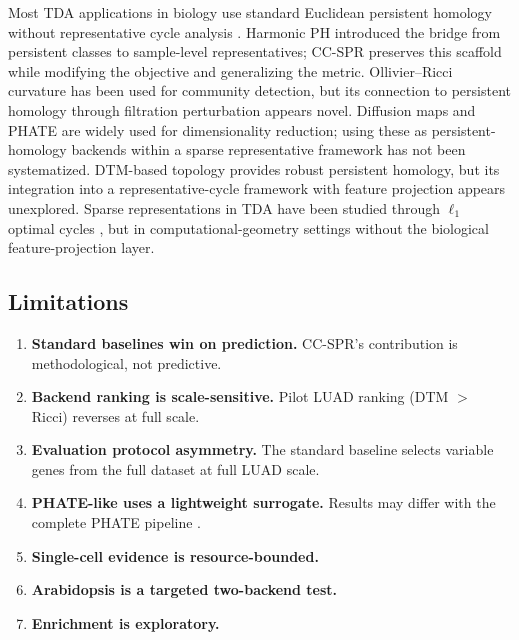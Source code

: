 \documentclass[12pt]{article}
\begin{document}
Most TDA applications in biology use standard Euclidean persistent homology without representative cycle analysis \citep{rizvi2017, xia2014, vipond2021, giusti2015, chan2013topology}.
Harmonic PH \citep{harmonicPH} introduced the bridge from persistent classes to sample-level representatives; CC-SPR preserves this scaffold while modifying the objective and generalizing the metric.
Ollivier--Ricci curvature \citep{ollivier2007, ollivier2009, ni2019community} has been used for community detection, but its connection to persistent homology through filtration perturbation appears novel.
Diffusion maps \citep{coifman2006diffusion} and PHATE \citep{moon2019phate} are widely used for dimensionality reduction; using these as persistent-homology backends within a sparse representative framework has not been systematized.
DTM-based topology \citep{chazal2011dtm, chazal2017robust} provides robust persistent homology, but its integration into a representative-cycle framework with feature projection appears unexplored.
Sparse representations in TDA have been studied through $\ell_1$ optimal cycles \citep{chen2011hardness, dey2011optimal}, but in computational-geometry settings without the biological feature-projection layer.

\subsection{Limitations}

\begin{enumerate}[leftmargin=1.5em]
\item \textbf{Standard baselines win on prediction.}
CC-SPR's contribution is methodological, not predictive.
\item \textbf{Backend ranking is scale-sensitive.}
Pilot LUAD ranking (DTM $>$ Ricci) reverses at full scale.
\item \textbf{Evaluation protocol asymmetry.}
The standard baseline selects variable genes from the full dataset at full LUAD scale.
\item \textbf{PHATE-like uses a lightweight surrogate.}
Results may differ with the complete PHATE pipeline \citep{moon2019phate}.
\item \textbf{Single-cell evidence is resource-bounded.}
\item \textbf{Arabidopsis is a targeted two-backend test.}
\item \textbf{Enrichment is exploratory.}
\end{enumerate}
\end{document}
